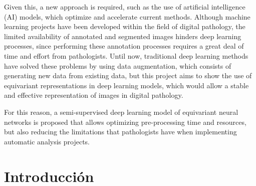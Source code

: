 \documentclass[12pt,letterpaper,final, openany]{scrbook}
\begin{document}
Given this, a new approach is required, such as the use of artificial intelligence (AI) models, which optimize and accelerate current methods. Although machine learning projects have been developed within the field of digital pathology, the limited availability of annotated and segmented images hinders deep learning processes, since performing these annotation processes requires a great deal of time and effort from pathologists. Until now, traditional deep learning methods have solved these problems by using data augmentation, which consists of generating new data from existing data, but this project aims to show the use of equivariant representations in deep learning models, which would allow a stable and effective representation of images in digital pathology.

For this reason, a semi-supervised deep learning model of equivariant neural networks is proposed that allows optimizing pre-processing time and resources, but also reducing the limitations that pathologists have when implementing automatic analysis projects.



\newpage
\chapter{Introducción}
\end{document}
